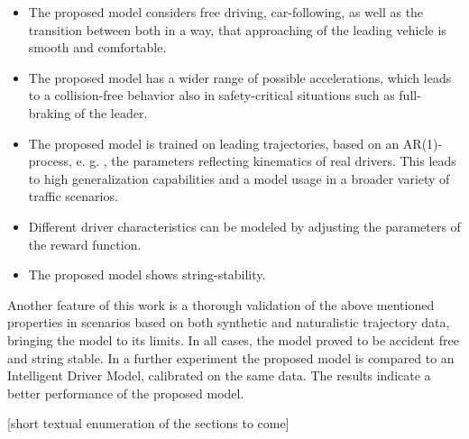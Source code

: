 \documentclass[review]{elsarticle}
\providecommand{\3}{{\ss}}
\begin{document}
\begin{itemize}
	\item  The proposed model considers free driving, car-following, as well as the transition between both in a way, that approaching of the leading vehicle is smooth and comfortable.
	\item The proposed model has a wider range of possible accelerations, which leads to a collision-free behavior also in safety-critical situations such as full-braking of the leader.
	\item The proposed model is trained on leading trajectories, based on an AR(1)-process, e. g. \cite{HonerkampEngl}, the parameters reflecting kinematics of real drivers. This leads to high generalization capabilities and a model usage in a broader variety of traffic scenarios. 
	\item Different driver characteristics can be modeled by adjusting the parameters of the reward function.
	\item The proposed model shows string-stability.
	
\end{itemize}

Another feature of this work is a thorough validation of the above mentioned properties in scenarios based on both synthetic and naturalistic trajectory data, bringing the model to its limits. 
In all cases, the model proved to be accident free and string stable.
In a further experiment the proposed model is compared to an Intelligent Driver Model, calibrated on the same data. The results indicate a better performance of the proposed model.


[short textual enumeration of the sections to come]
\end{document}
